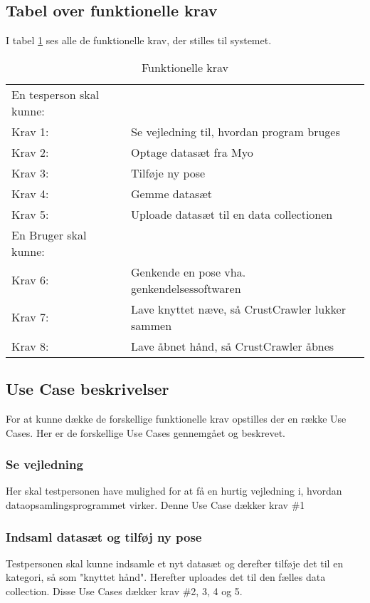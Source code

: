 \subsection*{Tabel over funktionelle krav}
I tabel \ref{tab:funktionellekrav} ses alle de funktionelle krav, der stilles til systemet.
\bgroup
\def\arraystretch{1.8}
\begin{center}
	\begin{table}
		\begin{tabular}{lp{225pt}}
			\rowcolor{grey} En tesperson skal kunne: &\\
			Krav 1:& Se vejledning til, hvordan program bruges\\
			Krav 2:& Optage datasæt fra Myo\\
			Krav 3:& Tilføje ny pose\\
			Krav 4:& Gemme datasæt\\
			Krav 5:& Uploade datasæt til en data collectionen\\
			\rowcolor{grey}En Bruger skal kunne: &\\
			Krav 6:& Genkende en pose vha. genkendelsessoftwaren\\
			Krav 7:& Lave knyttet næve, så CrustCrawler lukker sammen\\
			Krav 8:& Lave åbnet hånd, så CrustCrawler åbnes
		\end{tabular}
		\caption{Funktionelle krav}
		\label{tab:funktionellekrav}
	\end{table}	
\end{center}
\egroup

\subsection*{Use Case beskrivelser}
For at kunne dække de forskellige funktionelle krav opstilles der en række Use Cases. Her er de forskellige Use Cases gennemgået og beskrevet.

\subsubsection{Se vejledning}
Her skal testpersonen have mulighed for at få en hurtig vejledning i, hvordan dataopsamlingsprogrammet virker. Denne Use Case dækker krav \#1

\subsubsection{Indsaml datasæt og tilføj ny pose}
Testpersonen skal kunne indsamle et nyt datasæt og derefter tilføje det til en kategori, så som "knyttet hånd". Herefter uploades det til den fælles data collection. Disse Use Cases dækker krav \#2, 3, 4 og 5.

